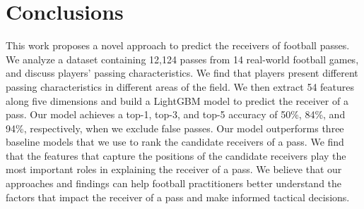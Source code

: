 \section{Conclusions} \label{conclusions}

This work proposes a novel approach to predict the receivers of football passes.
We analyze a dataset containing 12,124 passes from 14 real-world football games, and discuss players' passing characteristics. We find that players present different passing characteristics in different areas of the field.
We then extract 54 features along five dimensions and build a LightGBM model to predict the receiver of a pass. 
Our model achieves a top-1, top-3, and top-5 accuracy of 50\%, 84\%, and 94\%, respectively, when we exclude false passes.
Our model outperforms three baseline models that we use to rank the candidate receivers of a pass.
We find that the features that capture the positions of the candidate receivers play the most important roles in explaining the receiver of a pass.
We believe that our approaches and findings can help football practitioners better understand the factors that impact the receiver of a pass and make informed tactical decisions.